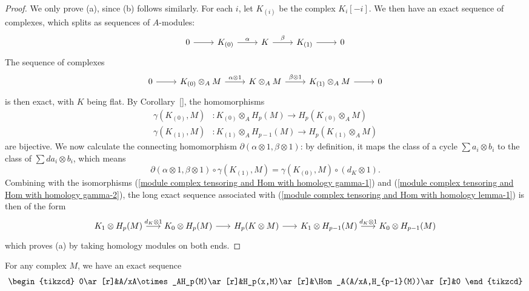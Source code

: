 \begin{proof}
We only prove (a), since (b) follows similarly. For each $i$, let $K_{(i)}$ be the complex $K_i[-i]$. We then have an exact sequence of complexes, which splits as sequences of $A$-modules:
\[\begin{tikzcd}
0\ar[r]&K_{(0)}\ar[r,"\alpha"]&K\ar[r,"\beta"]&K_{(1)}\ar[r]&0
\end{tikzcd}\]
The sequence of complexes
\begin{equation}\label{module complex tensoring and Hom with homology lemma-1}
\begin{tikzcd}
0\ar[r]&K_{(0)}\otimes_AM\ar[r,"\alpha\otimes 1"]&K\otimes_AM\ar[r,"\beta\otimes 1"]&K_{(1)}\otimes_AM\ar[r]&0
\end{tikzcd}
\end{equation}
is then exact, with $K$ being flat. By Corollary~\ref{}, the homomorphisms
\begin{align}
\gamma(K_{(0)},M)&:K_{(0)}\otimes_AH_p(M)\to H_p(K_{(0)}\otimes_AM)\label{module complex tensoring and Hom with homology gamma-1}\\
\gamma(K_{(1)},M)&:K_{(1)}\otimes_AH_{p-1}(M)\to H_p(K_{(1)}\otimes_AM)\label{module complex tensoring and Hom with homology gamma-2}
\end{align}
are bijective. We now calculate the connecting homomorphism $\partial(\alpha\otimes 1,\beta\otimes 1)$: by definition, it maps the class of a cycle $\sum a_i\otimes b_i$ to the class of $\sum da_i\otimes b_i$, which means
\[\partial(\alpha\otimes 1,\beta\otimes 1)\circ\gamma(K_{(1)},M)=\gamma(K_{(0)},M)\circ(d_K\otimes 1).\]
Combining with the isomorphisms (\ref{module complex tensoring and Hom with homology gamma-1}) and (\ref{module complex tensoring and Hom with homology gamma-2}), the long exact sequence associated with (\ref{module complex tensoring and Hom with homology lemma-1}) is then of the form
\[\begin{tikzcd}[column sep=6mm]
K_1\otimes H_p(M)\ar[r,"d_K\otimes 1"]&K_0\otimes H_p(M)\ar[r]&H_p(K\otimes M)\ar[r]&K_1\otimes H_{p-1}(M)\ar[r,"d_K\otimes 1"]&K_0\otimes H_{p-1}(M)
\end{tikzcd}\]
which proves (a) by taking homology modules on both ends.
\end{proof}
\begin{proposition}\label{Koszul complex iterated homology prop}
For any complex $M$, we have an exact sequence
\[\begin{tikzcd}
0\ar[r]&A/xA\otimes_AH_p(M)\ar[r]&H_p(x,M)\ar[r]&\Hom_A(A/xA,H_{p-1}(M))\ar[r]&0
\end{tikzcd}\]
\end{proposition}
